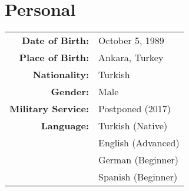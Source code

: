 \section{Personal} 
\sectionspacehalf

\begin{tabular}{rl}
{\bf Date of Birth:}		& October 5, 1989\\
{\bf Place of Birth:}		& Ankara, Turkey  \\
{\bf Nationality:}		& Turkish  \\
{\bf Gender:}			& Male \\
{\bf Military Service:}	& Postponed (2017) \\
{\bf Language:}		& Turkish (Native) \\
			& English (Advanced) \\
			& German (Beginner) \\
			& Spanish (Beginner) \\
\end{tabular}


\sectionspacehalf
